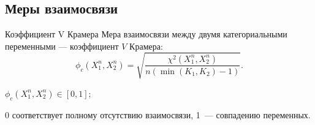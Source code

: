 \documentclass[9pt,pdf,utf8,hyperref={unicode},aspectratio=169]{beamer}
\begin{document}
\subsection{Меры взаимосвязи}
\begin{frame}{Коэффициент V Крамера}
	Мера взаимосвязи между двумя категориальными переменными --- коэффициент $V$ Крамера:
	$$\phi_c\left(X_1^n,X_2^n\right) = \sqrt{\frac{\chi^2\left(X_1^n,X_2^n\right)}{n\left(\min\left(K_1,K_2\right)-1\right)}}.$$
	
	$\phi_c\left(X_1^n,X_2^n\right) \in [0,1];$
    
    0 соответствует полному отсутствию взаимосвязи, 1~--- совпадению переменных.
%	
%	
\end{frame}
\end{document}
